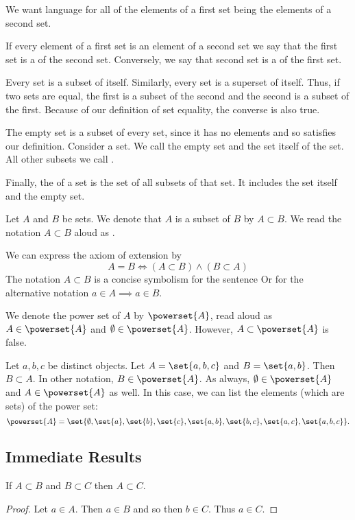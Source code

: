 

We want language for
all of the elements
of a first set being
the elements of a second set.


If every element
of a first set is
an element of a
second set we say
that the first set
is a 
of the second set.
Conversely, we say that
second set is a
 of
the first set.

Every set is a subset of itself.
Similarly, every set is a
superset of itself.
Thus, if two sets are equal,
the first is a subset of the
second and the second is
a subset of the first.
Because of our definition
of set equality, the converse
is also true.

The empty set is a subset of every set,
since it has no elements and so satisfies
our definition.
Consider a set.
We call the empty set and the set itself
of the set.
All other subsets we call
.


Finally, the 
of a set is the set of all subsets of that
set.
It includes the set itself and the empty set.

Let $A$ and $B$ be sets.
We denote that $A$ is a subset of $B$ by $A \subset B$.
We read the notation $A \subset B$ aloud as .

We can express the axiom of extension by
\[
  A = B \Leftrightarrow (A \subset B) \land (B \subset A)
\]
The notation $A \subset B$
is a concise symbolism for
the sentence
 Or for the alternative notation
$a \in A \implies a \in B$.


We denote the power set of $A$ by $\powerset{A}$, read aloud as 
$A \in \powerset{A}$ and $\emptyset \in \powerset{A}$.
However, $A \subset \powerset{A}$ is false.


Let $a, b, c$ be distinct
objects. Let $A = \set{a, b ,c}$
and $B = \set{a, b}$. Then
$B \subset A$.
In other notation,
$B \in \powerset{A}$.
As always, $\emptyset \in \powerset{A}$
and $A \in \powerset{A}$ as well.
In this case, we can
list the elements (which are sets)
of the power set:
\[
  \powerset{A} = \set{
    \emptyset,
    \set{a},
    \set{b},
    \set{c},
    \set{a, b},
    \set{b, c},
    \set{a, c},
    \set{a, b, c}
  }.
\]

\subsection{Immediate Results}

\begin{prop}
If $A \subset B$ and $B \subset C$ then $A \subset C$.
\begin{proof}
  Let $a \in A$. Then $a \in B$ and so then $b \in C$.
  Thus $a \in C$.
\end{proof}
\end{prop}

